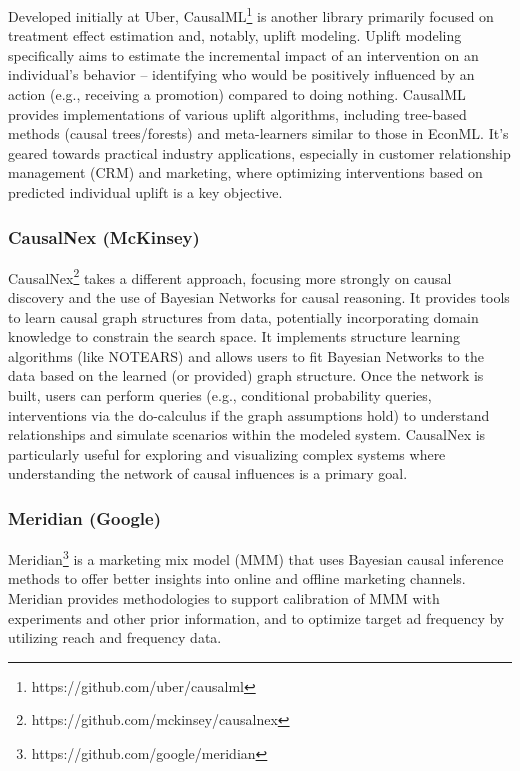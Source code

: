 {Developed initially at Uber, CausalML\footnote{https://github.com/uber/causalml} \cite{zhao2023causal} is another library primarily focused on treatment effect estimation and, notably, uplift modeling. Uplift modeling specifically aims to estimate the incremental impact of an intervention on an individual's behavior – identifying who would be positively influenced by an action (e.g., receiving a promotion) compared to doing nothing. CausalML provides implementations of various uplift algorithms, including tree-based methods (causal trees/forests) and meta-learners similar to those in EconML. It's geared towards practical industry applications, especially in customer relationship management (CRM) and marketing, where optimizing interventions based on predicted individual uplift is a key objective.

\subsubsection{CausalNex (McKinsey)}

CausalNex\footnote{https://github.com/mckinsey/causalnex} takes a different approach, focusing more strongly on causal discovery and the use of Bayesian Networks for causal reasoning. It provides tools to learn causal graph structures from data, potentially incorporating domain knowledge to constrain the search space. It implements structure learning algorithms (like NOTEARS) and allows users to fit Bayesian Networks to the data based on the learned (or provided) graph structure. Once the network is built, users can perform queries (e.g., conditional probability queries, interventions via the do-calculus if the graph assumptions hold) to understand relationships and simulate scenarios within the modeled system. CausalNex is particularly useful for exploring and visualizing complex systems where understanding the network of causal influences is a primary goal.


\subsubsection{Meridian (Google)}

Meridian\footnote{https://github.com/google/meridian} is a marketing mix model (MMM) that uses Bayesian causal inference methods to offer better insights into online and offline marketing channels. Meridian provides methodologies to support calibration of MMM with experiments and other prior information, and to optimize target ad frequency by utilizing reach and frequency data.

}
